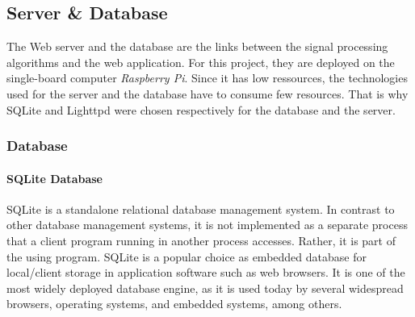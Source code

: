 \subsection{Server \& Database}

%
%
%
%

The Web server and the database are the links between the signal processing algorithms and the web application. For this project, they are deployed on the single-board computer \textit{Raspberry Pi}. Since it has low ressources, the technologies used for the server and the database have to consume few resources. That is why SQLite and Lighttpd were chosen respectively for the database and the server.

\subsubsection{Database}

    \paragraph{SQLite Database}
    
    SQLite is a standalone relational database management system. In contrast to other database management systems, it is not implemented as a separate process that a client program running in another process accesses. Rather, it is part of the using program. SQLite is a popular choice as embedded database for local/client storage in application software such as web browsers. It is one of the most widely deployed database engine, as it is used today by several widespread browsers, operating systems, and embedded systems, among others. 
    
